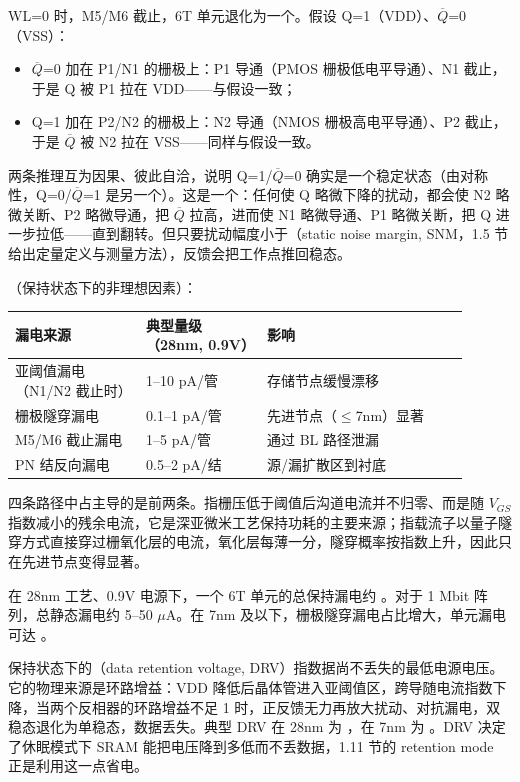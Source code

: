 WL=0 时，M5/M6 截止，6T 单元退化为一个。假设 Q=1（VDD）、$\overline{Q}$=0（VSS）：

\begin{itemize}
  \item $\overline{Q}$=0 加在 P1/N1 的栅极上：P1 导通（PMOS 栅极低电平导通）、N1 截止，于是 Q 被 P1 拉在 VDD——与假设一致；
  \item Q=1 加在 P2/N2 的栅极上：N2 导通（NMOS 栅极高电平导通）、P2 截止，于是 $\overline{Q}$ 被 N2 拉在 VSS——同样与假设一致。
\end{itemize}

两条推理互为因果、彼此自洽，说明 Q=1/$\overline{Q}$=0 确实是一个稳定状态（由对称性，Q=0/$\overline{Q}$=1 是另一个）。这是一个：任何使 Q 略微下降的扰动，都会使 N2 略微关断、P2 略微导通，把 $\overline{Q}$ 拉高，进而使 N1 略微导通、P1 略微关断，把 Q 进一步拉低——直到翻转。但只要扰动幅度小于（static noise margin, SNM，1.5 节给出定量定义与测量方法），反馈会把工作点推回稳态。

（保持状态下的非理想因素）：

\begin{longtable}{L{0.26\linewidth}L{0.24\linewidth}L{0.40\linewidth}}
\toprule
漏电来源 & 典型量级（28nm, 0.9V） & 影响 \\
\midrule
亚阈值漏电（N1/N2 截止时） & 1--10 pA/管 & 存储节点缓慢漂移 \\
栅极隧穿漏电 & 0.1--1 pA/管 & 先进节点（$\leq$7nm）显著 \\
M5/M6 截止漏电 & 1--5 pA/管 & 通过 BL 路径泄漏 \\
PN 结反向漏电 & 0.5--2 pA/结 & 源/漏扩散区到衬底 \\
\bottomrule
\end{longtable}

四条路径中占主导的是前两条。指栅压低于阈值后沟道电流并不归零、而是随 $V_{GS}$ 指数减小的残余电流，它是深亚微米工艺保持功耗的主要来源；指载流子以量子隧穿方式直接穿过栅氧化层的电流，氧化层每薄一分，隧穿概率按指数上升，因此只在先进节点变得显著。

在 28nm 工艺、0.9V 电源下，一个 6T 单元的总保持漏电约 。对于 1 Mbit 阵列，总静态漏电约 5--50 $\mu$A。在 7nm 及以下，栅极隧穿漏电占比增大，单元漏电可达 。

保持状态下的（data retention voltage, DRV）指数据尚不丢失的最低电源电压。它的物理来源是环路增益：VDD 降低后晶体管进入亚阈值区，跨导随电流指数下降，当两个反相器的环路增益不足 1 时，正反馈无力再放大扰动、对抗漏电，双稳态退化为单稳态，数据丢失。典型 DRV 在 28nm 为 ，在 7nm 为 。DRV 决定了休眠模式下 SRAM 能把电压降到多低而不丢数据，1.11 节的 retention mode 正是利用这一点省电。


